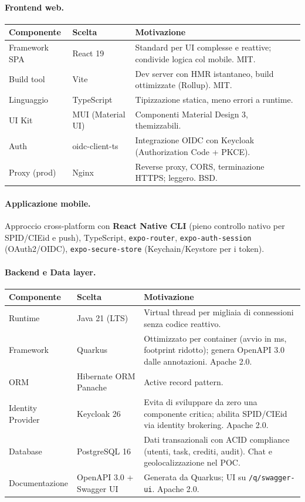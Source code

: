 \documentclass[11pt,a4paper]{article}
\begin{document}
\paragraph{Frontend web.}
\begin{xltabular}{\linewidth}{|L{3.2cm}|L{3.2cm}|Y|}
\hline
{}\color{white}\bfseries Componente & \color{white}\bfseries Scelta & \color{white}\bfseries Motivazione\\\hline
\endhead
Framework SPA & React 19 & Standard per UI complesse e reattive; condivide logica col mobile. MIT.\\\hline
Build tool & Vite & Dev server con HMR istantaneo, build ottimizzate (Rollup). MIT.\\\hline
Linguaggio & TypeScript & Tipizzazione statica, meno errori a runtime.\\\hline
UI Kit & MUI (Material UI) & Componenti Material Design 3, themizzabili.\\\hline
Auth & oidc-client-ts & Integrazione OIDC con Keycloak (Authorization Code + PKCE).\\\hline
Proxy (prod) & Nginx & Reverse proxy, CORS, terminazione HTTPS; leggero. BSD.\\\hline
\end{xltabular}

\paragraph{Applicazione mobile.} Approccio cross-platform con \textbf{React Native CLI} (pieno controllo nativo per SPID/CIEid e push), TypeScript, \texttt{expo-router}, \texttt{expo-auth-session} (OAuth2/OIDC), \texttt{expo-secure-store} (Keychain/Keystore per i token).

\paragraph{Backend e Data layer.}
\begin{xltabular}{\linewidth}{|L{3.2cm}|L{3.2cm}|Y|}
\hline
{}\color{white}\bfseries Componente & \color{white}\bfseries Scelta & \color{white}\bfseries Motivazione\\\hline
\endhead
Runtime & Java 21 (LTS) & Virtual thread per migliaia di connessioni senza codice reattivo.\\\hline
Framework & Quarkus & Ottimizzato per container (avvio in ms, footprint ridotto); genera OpenAPI 3.0 dalle annotazioni. Apache 2.0.\\\hline
ORM & Hibernate ORM Panache & Active record pattern.\\\hline
Identity Provider & Keycloak 26 & Evita di sviluppare da zero una componente critica; abilita SPID/CIEid via identity brokering. Apache 2.0.\\\hline
Database & PostgreSQL 16 & Dati transazionali con ACID compliance (utenti, task, crediti, audit). Chat e geolocalizzazione nel POC.\\\hline
Documentazione & OpenAPI 3.0 + Swagger UI & Generata da Quarkus; UI su \texttt{/q/swagger-ui}. Apache 2.0.\\\hline
\end{xltabular}
\end{document}
